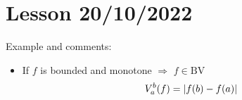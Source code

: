 \section{Lesson 20/10/2022}
Example and comments:
\begin{itemize}
    \item If \(f\) is bounded and monotone \(\Longrightarrow\) \(f \in \mbox{BV}\)
    \[
        V_a^b (f) = \abs{f(b) - f(a)}
    \]
\end{itemize}